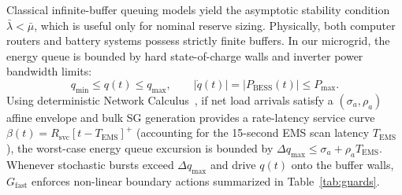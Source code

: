 \documentclass[journal]{IEEEtran}
\begin{document}
Classical infinite-buffer queuing models yield the asymptotic stability condition $\bar{\lambda} < \bar{\mu}$, which is useful only for nominal reserve sizing. Physically, both computer routers and battery systems possess strictly finite buffers. In our microgrid, the energy queue is bounded by hard state-of-charge walls and inverter power bandwidth limits:
\begin{equation}
    q_{\min} \le q(t) \le q_{\max}, \qquad |\dot{q}(t)| = |P_{\mathrm{BESS}}(t)| \le P_{\max}.
    \label{eq:queue_bounds}
\end{equation}
Using deterministic Network Calculus~\cite{LeBoudec2001}, if net load arrivals satisfy a $(\sigma_a, \rho_a)$ affine envelope and bulk SG generation provides a rate-latency service curve $\beta(t) = R_{\mathrm{svc}}[t - T_{\mathrm{EMS}}]^+$ (accounting for the 15-second EMS scan latency $T_{\mathrm{EMS}}$), the worst-case energy queue excursion is bounded by $\Delta q_{\max} \le \sigma_a + \rho_a T_{\mathrm{EMS}}$. Whenever stochastic bursts exceed $\Delta q_{\max}$ and drive $q(t)$ onto the buffer walls, $G_{\mathrm{fast}}$ enforces non-linear boundary actions summarized in Table~\ref{tab:guards}.
\end{document}
